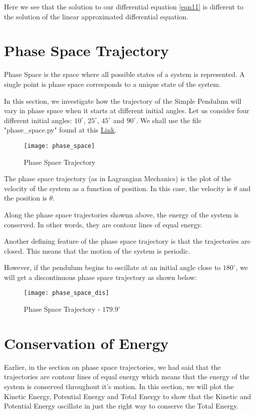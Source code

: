 \documentclass[12pt]{article}
\begin{document}
Here we see that the solution to our differential equation \ref{eqn11} is different to the solution of the linear approximated differential equation.

\section{Phase Space Trajectory}

Phase Space is the space where all possible states of a system is represented. A single point is phase space corresponds to a unique state of the system.

In this section, we investigate how the trajectory of the Simple Pendulum will vary in phase space when it starts at different initial angles.
Let us consider four different initial angles: $10^\circ$, $25^\circ$, $45^\circ$ and $90^\circ$. We shall use the file "phase\_space.py" found at this
\textcolor{blue}{\underline{\href{https://github.com/kkin1995/simulations/phase_space.py}{Link}}}.

\begin{figure}[H]
    \centering
    \caption{Phase Space Trajectory}
    \texttt{[image: phase\_space]}
    \label{fig:phasespace}
\end{figure}

The phase space trajectory (as in Lagrangian Mechanics) is the plot of the velocity of the system as a function of position. In this case, the velocity is
$\dot{\theta}$ and the position is $\theta$.

Along the phase space trajectories shownn above, the energy of the system is conserved. In other words, they are contour lines of equal energy.

Another defining feature of the phase space trajectory is that the trajectories are closed. This means that the motion of the system is periodic.

However, if the pendulum begins to oscillate at an initial angle close to $180^\circ$, we will get a discontinuous phase space trajectory as shown below:

\begin{figure}[H]
    \centering
    \caption{Phase Space Trajectory - $179.9^\circ$}
    \texttt{[image: phase\_space\_dis]}
    \label{fig:phasespacediscontinuous}
\end{figure}

\section{Conservation of Energy}
Earlier, in the section on phase space trajectories, we had said that the trajectories are contour lines of equal energy which means that the energy of the system is
conserved throughout it's motion. In this section, we will plot the Kinetic Energy, Potential Energy and Total Energy to show that the Kinetic and Potential Energy oscillate
in just the right way to conserve the Total Energy.
\end{document}
